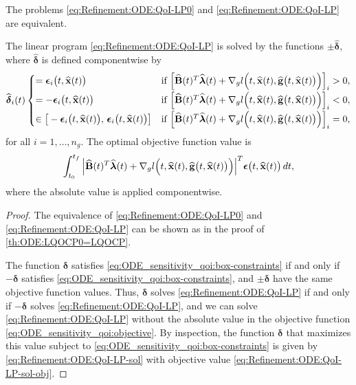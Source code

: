 \documentclass[onefignum,onetabnum]{siamart220329}
\numberwithin{equation}{section}
\newcommand{\bg}{\ensuremath{\mathbf{g}}} %
\newcommand{\bx}{\ensuremath{\mathbf{x}}} %
\newcommand {\bdelta} {\boldsymbol{\delta}}
\newcommand {\bepsilon} {\mbox{\boldmath $\epsilon$}}
\newcommand {\blambda} {\mbox{\boldmath $\lambda$}}
\newcommand{\BB}{\ensuremath{\mathbf{B}} } %
\begin{document}
\begin{theorem}   \label{th:Refinement:ODE:QoI-LP-sol}
    The problems \eqref{eq:Refinement:ODE:QoI-LP0} and  \eqref{eq:Refinement:ODE:QoI-LP} are equivalent.

     The linear program \eqref{eq:Refinement:ODE:QoI-LP} is solved by the functions $\pm \widehat{\bdelta}$, where $\widehat{\bdelta}$ is defined componentwise by
     \begin{equation}   \label{eq:Refinement:ODE:QoI-LP-sol}
           \widehat{\bdelta}_i(t)   
           \begin{cases} 
                       = \bepsilon_i\big( t, \widehat{\bx}(t) \big)  & \mbox{if }  \Big[\widehat{\BB}(t)^T \widehat{\blambda}(t) + \nabla_g l \Big( t, \widehat{\bx}(t), \widehat{\bg} \big( t, \widehat{\bx}(t) \big) \Big) \Big]_i > 0, \\[1ex]
                        = -\bepsilon_i\big( t, \widehat{\bx}(t) \big)  & \mbox{if }  \Big[\widehat{\BB}(t)^T \widehat{\blambda}(t) + \nabla_g l \Big( t, \widehat{\bx}(t), \widehat{\bg} \big( t, \widehat{\bx}(t) \big) \Big) \Big]_i < 0, \\[1ex]
                         \in \big[  - \bepsilon_i\big( t, \widehat{\bx}(t) \big) , \, \bepsilon_i\big( t, \widehat{\bx}(t) \big) \big] &  \mbox{if }  \Big[\widehat{\BB}(t)^T \widehat{\blambda}(t) + \nabla_g l \Big( t, \widehat{\bx}(t), \widehat{\bg} \big( t, \widehat{\bx}(t) \big) \Big) \Big]_i  = 0,
           \end{cases}
     \end{equation}
     for all $i = 1, \dots, n_g$.
The optimal objective function value is
     \begin{equation}   \label{eq:Refinement:ODE:QoI-LP-sol-obj}
\int_{t_0}^{t_f}  \Big|  \widehat{\BB}(t)^T \widehat{\blambda}(t) + \nabla_g l \Big( t, \widehat{\bx}(t), \widehat{\bg} \big( t, \widehat{\bx}(t) \big) \Big)  \Big|^T   \bepsilon\big( t, \widehat{\bx}(t) \big) \,  dt,
     \end{equation}
     where the absolute value is applied componentwise.
\end{theorem}
\begin{proof}
    The equivalence of  \eqref{eq:Refinement:ODE:QoI-LP0} and  \eqref{eq:Refinement:ODE:QoI-LP} can be shown as in the proof
    of \cref{th:ODE:LQOCP0=LQOCP}.
    
    The function $\bdelta$ satisfies \eqref{eq:ODE_sensitivity_qoi:box-constraints} if and only if $-\bdelta$ satisfies
     \eqref{eq:ODE_sensitivity_qoi:box-constraints},
    and $\pm \bdelta$  have the same objective function values.
    Thus,  $\bdelta$  solves \eqref{eq:Refinement:ODE:QoI-LP} if and only
    if $-\bdelta$ solves \eqref{eq:Refinement:ODE:QoI-LP}, and we can solve \eqref{eq:Refinement:ODE:QoI-LP} without the absolute value in the objective
    function \eqref{eq:ODE_sensitivity_qoi:objective}. By inspection, the function  $\bdelta$ that maximizes 
this value subject to  \eqref{eq:ODE_sensitivity_qoi:box-constraints}
    is given by \eqref{eq:Refinement:ODE:QoI-LP-sol} with objective value \eqref{eq:Refinement:ODE:QoI-LP-sol-obj}.
\end{proof}
\end{document}
